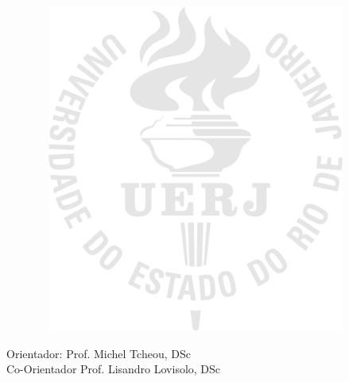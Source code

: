 \begin{center}

\setNomeAluno
\vspace{2cm}

\textbf{\setTitulo}

\vspace{1.0cm}

\begin{figure}[hbt!]
\begin{center}
\includegraphics[width=10.48cm,height=10.8cm]{./01_Pre_textuais/figures/logo_uerj_gnd_pb.png}
\end{center}
\end{figure}

\vspace{-9cm}
\begin{flushright}
\parbox{8cm}{
}
\end{flushright}

\vspace{4.0cm}

Orientador: Prof. Michel Tcheou, DSc\\
Co-Orientador Prof. Lisandro Lovisolo, DSc\\

\par\vfill

\setLocationDate
\end{center}